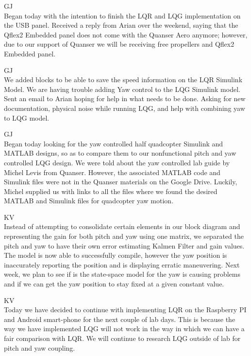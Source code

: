 \documentclass[fontsize=11pt, %
                             paper=letter, %
                             openany, %
                             captions=tableheading,
                             index=totoc,
                             hyperref]{labbook}
\begin{document}
\begin{addmargin}[0cm]{0cm}
GJ\\
Began today with the intention to finish the LQR and LQG implementation on the USB panel.  Received a reply from Arian over the weekend, saying that the Qflex2 Embedded panel does not come with the Quanser Aero anymore; however, due to our support of Quanser we will be receiving free propellers and Qflex2 Embedded panel.

GJ\\
We added blocks to be able to save the speed information on the LQR Simulink Model.  We are having trouble adding Yaw control to the LQG Simulink model.  Sent an email to Arian hoping for help in what needs to be done.  Asking for new documentation, physical noise while running LQG, and help with combining yaw to LQG model.

GJ\\
Began today looking for the yaw controlled half quadcopter Simulink and MATLAB designs, so as to compare them to our nonfunctional pitch and yaw controlled LQG design.  We were told about the yaw controlled lab guide by Michel Levis from Quanser.  However, the associated MATLAB code and Simulink files were not in the Quanser materials on the Google Drive.  Luckily, Michel supplied us with links to all the files where we found the desired MATLAB and Simulink files for quadcopter yaw motion.

KV\\
Instead of attempting to consolidate certain elements in our block diagram and representing the gain for both pitch and yaw using one matrix, we separated the pitch and yaw to have their own error estimating Kalmen Filter and gain values.  The model is now able to successfully compile, however the yaw position is inaccurately reporting the position and is displaying erratic maneuvering.  Next week, we plan to see if is the state-space model for the yaw is causing problems and if we can get the yaw position to stay fixed at a given constant value. 


KV\\
Today we have decided to continue with implementing LQR on the Raspberry PI and Android smart-phone for the next couple of lab days.  This is because the way we have implemented LQG will not work in the way in which we can have a fair comparison with LQR.  We will continue to research LQG outside of lab for pitch and yaw coupling.


\end{addmargin}
\end{document}
